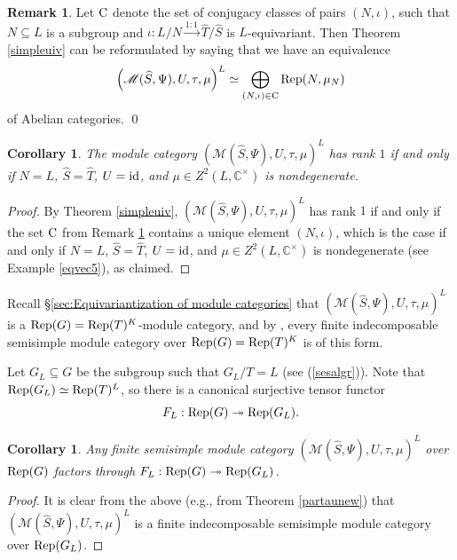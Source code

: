 \documentclass{amsart}
\newtheorem{corollary}[theorem]{Corollary}
\theoremstyle{definition}
\newtheorem{remark}[theorem]{Remark}
\newcommand{\id}{{\rm id}}
\newcommand{\Rep}{{\rm Rep}}
\newcommand{\M}{\mathscr{M}}
\numberwithin{equation}{section}
\begin{document}
\begin{remark}\label{setC}
Let ${\rm C}$ denote the set of conjugacy classes of pairs $(N,\iota)$, such that $N\subseteq L$ is a subgroup and $\iota:L/N\xrightarrow{1:1}\widehat{T}/\widehat{S}$ is $L$-equivariant. Then 
Theorem \ref{simpleuiv} can be reformulated by saying that we have an equivalence
$$\left(\M(\widehat{S},\Psi),U,\tau,\mu\right)^L\simeq \bigoplus_{(N,\iota)\in{\rm C}}{\rm Rep}(N,\mu_N)$$
of Abelian categories. \qed
\end{remark}

\begin{corollary}\label{modcatr2r1}
The module category $\left(\M(\widehat{S},\Psi),U,\tau,\mu\right)^L$ has rank $1$ if and only if $N=L$, $\widehat{S}=\widehat{T}$, $U=\id$, and $\mu\in Z^2(L,\mathbb{C}^{\times})$ is nondegenerate. 
\end{corollary}

\begin{proof}
By Theorem \ref{simpleuiv}, $\left(\M(\widehat{S},\Psi),U,\tau,\mu\right)^L$ has rank $1$ if and only if the set ${\rm C}$ from Remark \ref{setC} contains a unique element $(N,\iota)$, which  is the case if and only if $N=L$, $\widehat{S}=\widehat{T}$, $U=\id$, and  $\mu\in Z^2(L,\mathbb{C}^{\times})$ is nondegenerate (see Example \ref{eqvec5}), as claimed.
\end{proof}

Recall \S\ref{sec:Equivariantization of module categories} that $\left(\M(\widehat{S},\Psi),U,\tau,\mu\right)^L$ is a $\Rep(G)=\Rep(T)^K$-module category, and by \cite[Proposition 5.4]{ENO}, every finite indecomposable semisimple module category over $\Rep(G)=\Rep(T)^K$ is of this form.

Let $G_L\subseteq G$ be the subgroup such that $G_L/T=L$ (see (\ref{sesalgr})). Note that $\Rep(G_L)\simeq \Rep(T)^L$, so there is a canonical surjective tensor functor 
$$F_L:\Rep(G)\twoheadrightarrow \Rep(G_L).$$

\begin{corollary}\label{modfactor}
Any finite semisimple module category $\left(\M(\widehat{S},\Psi),U,\tau,\mu\right)^L$ over $\Rep(G)$ factors through $F_L:\Rep(G)\twoheadrightarrow \Rep(G_L)$.
\end{corollary}

\begin{proof}
It is clear from the above (e.g., from Theorem \ref{partaunew}) that $\left(\M(\widehat{S},\Psi),U,\tau,\mu\right)^L$ is a finite indecomposable semisimple module category over $\Rep(G_L)$.
\end{proof}
\end{document}
